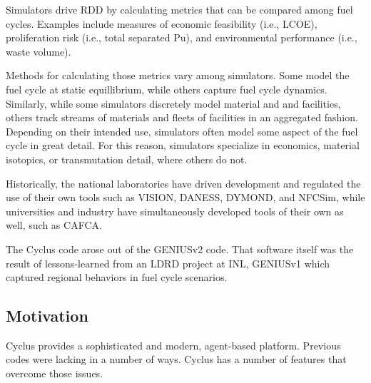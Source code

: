
Simulators drive \gls{RDD} by calculating metrics that can be compared among fuel 
cycles. Examples include measures of economic feasibility (i.e., \gls{LCOE}), 
proliferation risk (i.e., total separated Pu), and environmental performance 
(i.e., waste volume). 

Methods for calculating those metrics vary among simulators. Some model the fuel cycle at static equillibrium, while others 
capture fuel cycle dynamics.  Similarly, while some simulators discretely model 
material and and facilities, others track streams of materials and 
fleets of facilities in an aggregated fashion. Depending on their intended use, 
simulators often model some aspect of the fuel cycle in great detail. For this 
reason, simulators specialize in economics, material isotopics, or 
transmutation detail, where others do not. 

Historically, the national laboratories have driven development and regulated 
the use of their own tools such as \gls{VISION}\cite{jacobson_verifiable_2010}, 
\gls{DANESS}\cite{van_den_durpel_daness_2009}, 
\gls{DYMOND}\cite{modeling_yacout_2005}, and 
\gls{NFCSim}\cite{schneider_nfcsim:_2005}, while universities and industry have 
simultaneously developed tools of their own as well, such as 
\gls{CAFCA}\cite{guerin_benchmark_2006}.

The Cyclus code arose out of the 
\gls{GENIUSv2}\cite{oliver_studying_2009,huff_geniusv2_2009} code. That software 
itself was the result of lessons-learned from an \gls{LDRD} project at 
\gls{INL}, 
\gls{GENIUSv1}\cite{dunzik-gougar_global_2007,jain_transitioning_2006} which 
captured regional behaviors in fuel cycle scenarios. 


\subsection{Motivation}

Cyclus provides a sophisticated and modern, agent-based platform. Previous 
codes were lacking in a number of ways. Cyclus has a number of features that 
overcome those issues.  

